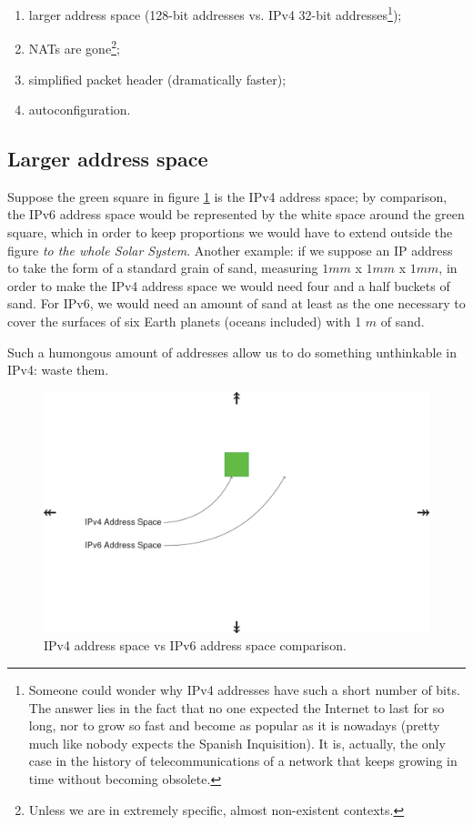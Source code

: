 \begin{enumerate}
    \item larger address space (128-bit addresses vs. IPv4 32-bit addresses\footnote{Someone could wonder why IPv4 addresses have such a short number of bits. The answer lies in the fact that no one expected the Internet to last for so long, nor to grow so fast and become as popular as it is nowadays (pretty much like nobody expects the Spanish Inquisition). It is, actually, the only case in the history of telecommunications of a network that keeps growing in time without becoming obsolete.});
    \item NATs are gone\footnote{Unless we are in extremely specific, almost non-existent contexts.};
    \item simplified packet header (dramatically faster);
    \item autoconfiguration.
\end{enumerate}


\subsection{Larger address space}
Suppose the green square in figure \ref{fig:ipv4_address_space} is the IPv4 address space; by comparison, the IPv6 address space would be represented by the white space around the green square, which in order to keep proportions we would have to extend outside the figure \textit{to the whole Solar System}. Another example: if we suppose an IP address to take the form of a standard grain of sand, measuring $1 mm$ x $1mm$ x $1mm$, in order to make the IPv4 address space we would need four and a half buckets of sand. For IPv6, we would need an amount of sand at least as the one necessary to cover the surfaces of six Earth planets (oceans included) with 1 $m$ of sand.

Such a humongous amount of addresses allow us to do something unthinkable in IPv4: waste them.

\begin{figure}[h]
    \centering
    \includegraphics[scale=0.3]{img/ipv4_address_space.png}
    \decoRule
    \caption{IPv4 address space vs IPv6 address space comparison.}
    \label{fig:ipv4_address_space}
\end{figure}

